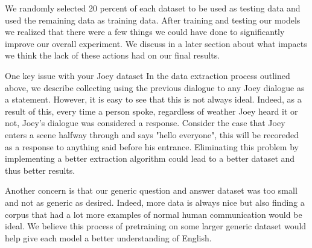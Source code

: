 %
We randomly selected 20 percent of each dataset to be used as testing data and used the remaining data as training data.
After training and testing our models we realized that there were a few things we could have done to significantly improve our overall experiment. 
We discuss in a later section about what impacts we think the lack of these actions had on our final results.

One key issue with your Joey dataset
In the data extraction process outlined above, we describe collecting using the previous dialogue to any Joey dialogue as a statement.
However, it is easy to see that this is not always ideal.
Indeed, as a result of this, every time a person spoke, regardless of weather Joey heard it or not, Joey's dialogue was considered a response.
Consider the case that Joey enters a scene halfway through and says "hello everyone", this will be recoreded as a response to anything said before his entrance.
Eliminating this problem by implementing a better extraction algorithm could lead to a better dataset and thus better results.

Another concern is that our generic question and answer dataset was too small and not as generic as desired.
Indeed, more data is always nice but also finding a corpus that had a lot more examples of normal human communication would be ideal.
We believe this process of pretraining on some larger generic dataset would help give each model a better understanding of English.